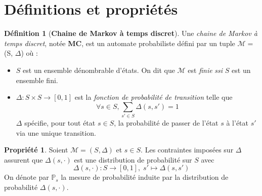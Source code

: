 \documentclass[12pt,a4paper]{report}
\theoremstyle{definition}%
\newtheorem{definition}{Définition}[chapter]
\newtheorem{propriete}{Propriété}[chapter]
\theoremstyle{remark}
\newtheorem{example}{Exemple}[chapter]
\newcommand{\ssi}{\textit{ssi} }
\newcommand{\ie}{\textit{i.e.}, }
\newcommand{\pr}{\mathbb{P}}
\let\labelitemi\labelitemii
\begin{document}

\section{Définitions et propriétés}
\theoremstyle{definition}
\begin{definition}[\textbf{Chaine de Markov à temps discret}]
	
	Une \textit{chaine de Markov à temps discret}, notée \textbf{MC}, est un automate probabiliste défini par un tuple  $\mathcal{M} =$ (S, $\Delta$) où :
	\begin{itemize}
		\renewcommand{\labelitemi}{\tiny$\bullet$}
		\item $S$ est un ensemble dénombrable d'états. On dit que $\mathcal{M}$ est \textit{finie} \ssi $S$ est un ensemble fini.
		\item $\Delta: S \times S \rightarrow [0,1]$ est la \textit{fonction de probabilité de transition} telle que \[\forall s \in S, \sum_{s' \in S}\Delta(s, s')= 1\]
		$\Delta$ spécifie, pour tout état $s \in S$, la probabilité de passer de l'état $s$ à l'état $s'$ via une unique transition. 
	\end{itemize}
\end{definition}

\begin{propriete}
	Soient $\mathcal{M} = (S, \Delta)$ et $s \in S$.
	Les contraintes imposées sur $\Delta$ assurent que $\Delta(s, \cdot)$ est une distribution de probabilité sur $S$ avec \[\Delta(s, \cdot) : S \rightarrow [0, 1], \; s' \mapsto \Delta(s, s')\] On dénote par $\pr_s$ la mesure de probabilité induite par la distribution de probabilité $\Delta(s, \cdot)$.%
\end{propriete}
\end{document}
